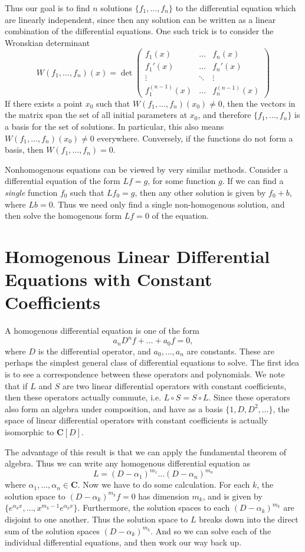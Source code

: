 Thus our goal is to find $n$ solutions $\{ f_1, \dots, f_n \}$ to the differential equation which are linearly independent, since then any solution can be written as a linear combination of the differential equations. One such trick is to consider the Wronskian determinant
%
\[ W(f_1, \dots, f_n)(x) = \det \begin{pmatrix} f_1(x) & \dots & f_n(x) \\ f_1'(x) & \dots & f_n'(x) \\ \vdots & \ddots & \vdots \\ f_1^{(n-1)}(x) & \dots & f_n^{(n-1)}(x) \end{pmatrix} \]
%
If there exists a point $x_0$ such that $W(f_1, \dots, f_n)(x_0) \neq 0$, then the vectors in the matrix span the set of all initial parameters at $x_0$, and therefore $\{ f_1, \dots, f_n \}$ is a basis for the set of solutions. In particular, this also means $W(f_1, \dots, f_n)(x_0) \neq 0$ everywhere. Conversely, if the functions do not form a basis, then $W(f_1, \dots, f_n) = 0$.

Nonhomogenous equations can be viewed by very similar methods. Consider a differential equation of the form $Lf = g$, for some function $g$. If we can find a \emph{single} function $f_0$ such that $Lf_0 = g$, then any other solution is given by $f_0 + b$, where $Lb = 0$. Thus we need only find a single non-homogenous solution, and then solve the homogenous form $Lf = 0$ of the equation.

\section{Homogenous Linear Differential Equations with Constant Coefficients}

A homogenous differential equation is one of the form
%
\[ a_n D^nf + \dots + a_0 f = 0, \]
%
where $D$ is the differential operator, and $a_0, \dots, a_n$ are constants. These are perhaps the simplest general class of differential equations to solve. The first idea is to see a correspondence between these operators and polynomials. We note that if $L$ and $S$ are two linear differential operators with constant coefficients, then these operators actually commute, i.e. $L \circ S = S \circ L$. Since these operators also form an algebra under composition, and have as a basis $\{ 1, D, D^2, \dots \}$, the space of linear differential operators with constant coefficients is actually isomorphic to $\mathbf{C}[D]$.

The advantage of this result is that we can apply the fundamental theorem of algebra. Thus we can write any homogenous differential equation as
%
\[ L = (D - \alpha_1)^{m_1} \dots (D - \alpha_n)^{m_n} \]
%
where $\alpha_1, \dots, \alpha_n \in \mathbf{C}$. Now we have to do some calculation. For each $k$, the solution space to $(D - \alpha_k)^{m_k} f = 0$ has dimension $m_k$, and is given by $\{ e^{\alpha_k x}, \dots, x^{m_k - 1} e^{\alpha_k x} \}$. Furthermore, the solution spaces to each $(D - \alpha_k)^{m_k}$ are disjoint to one another. Thus the solution space to $L$ breaks down into the direct sum of the solution spaces $(D - \alpha_k)^{m_k}$. And so we can solve each of the individual differential equations, and then work our way back up.


